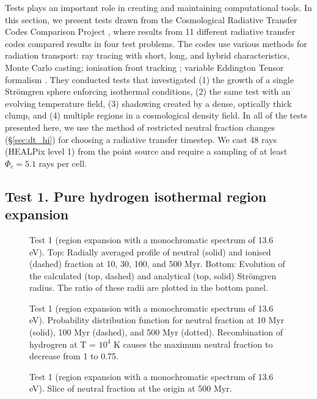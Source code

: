 \documentclass[useAMS,usenatbib]{mn2e}
\begin{document}
Tests plays an important role in creating and maintaining
computational tools.  In this section, we present tests drawn from the
Cosmological Radiative Transfer Codes Comparison Project \citep{RT06},
where results from 11 different radiative transfer codes compared
results in four test problems.  The codes use various methods for
radiation transport: ray tracing with short, long, and hybrid
characteristics, Monte Carlo casting; ionisation front tracking
\citep{Alvarez06_IFT}; variable Eddington Tensor formalism
\citep{Gnedin01_OTVET}.  They conducted tests that investigated (1)
the growth of a single Str\"{o}mgren sphere enforcing isothermal
conditions, (2) the same test with an evolving temperature field, (3)
shadowing created by a dense, optically thick clump, and (4) multiple
\hii regions in a cosmological density field.  In all of the
tests presented here, we use the method of restricted neutral fraction
changes (\S\ref{sec:dt_hi}) for choosing a radiative transfer
timestep.  We cast 48 rays (HEALPix level 1) from the point source and
require a sampling of at least $\Phi_c = 5.1$ rays per cell.

\subsection{Test 1. Pure hydrogen isothermal \hii region
  expansion}
\label{sec:test1}

\begin{figure}
  \caption{\label{fig:test1_ifront} Test 1 (\hii region
    expansion with a monochromatic spectrum of 13.6 eV).  Top:
    Radially averaged profile of neutral (solid) and ionised (dashed)
    fraction at 10, 30, 100, and 500 Myr.  Bottom: Evolution of the
    calculated (top, dashed) and analytical (top, solid) Str\"{o}mgren
    radius.  The ratio of these radii are plotted in the bottom panel.}
\end{figure}

\begin{figure}
  \caption{\label{fig:test1_pdf} Test 1 (\hii region expansion with a
    monochromatic spectrum of 13.6 eV). Probability distribution
    function for neutral fraction at 10 Myr (solid), 100 Myr (dashed),
    and 500 Myr (dotted).  Recombination of hydrogren at T = $10^4$ K
    causes the maximum neutral fraction to decrease from 1 to 0.75.}
\end{figure}

\begin{figure}
  \caption{\label{fig:test1_HI} Test 1 (\hii region expansion
    with a monochromatic spectrum of 13.6 eV). Slice of neutral
    fraction at the origin at 500 Myr.}
\end{figure}
\end{document}
